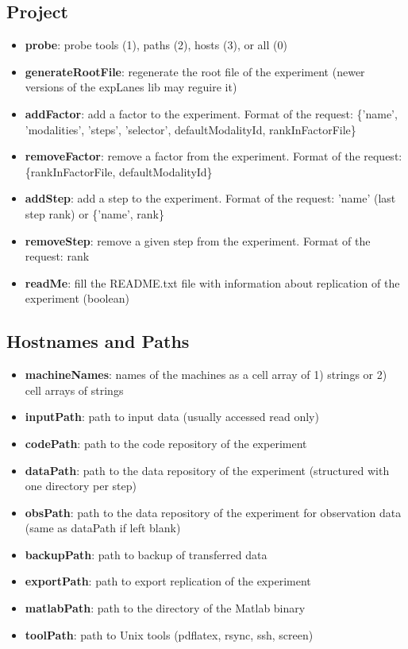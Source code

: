 \documentclass[a4paper,fleqn]{tufte-handout}
\begin{document}
\subsection{Project}

\begin{itemize}
\item \textbf{probe}: probe tools (1), paths (2), hosts (3), or all (0)
\item \textbf{generateRootFile}: regenerate the root file of the experiment (newer versions of the expLanes lib may reguire it)
\item \textbf{addFactor}: add a factor to the experiment. Format of the request: \{'name', 'modalities', 'steps', 'selector', defaultModalityId, rankInFactorFile\}
\item \textbf{removeFactor}: remove a factor from the experiment. Format of the request: \{rankInFactorFile, defaultModalityId\}
\item \textbf{addStep}: add a step to the experiment. Format of the request: 'name' (last step rank) or \{'name', rank\}
\item \textbf{removeStep}: remove a given step from the experiment. Format of the request: rank
\item \textbf{readMe}: fill the README.txt file with information about replication of the experiment (boolean)
\end{itemize}

\subsection{Hostnames and Paths}

\begin{itemize}
\item \textbf{machineNames}: names of the machines as a cell array of 1) strings or 2) cell arrays of strings
\item \textbf{inputPath}: path to input data (usually accessed read only)
\item \textbf{codePath}: path to the code repository of the experiment
\item \textbf{dataPath}: path to the data repository of the experiment (structured with one directory per step)
\item \textbf{obsPath}: path to the data repository of the experiment for observation data (same as dataPath if left blank)
\item \textbf{backupPath}: path to backup of transferred data
\item \textbf{exportPath}: path to export replication of the experiment
\item \textbf{matlabPath}: path to the directory of the Matlab binary 
\item \textbf{toolPath}: path to Unix tools (pdflatex, rsync, ssh, screen)
\end{itemize}
\end{document}
